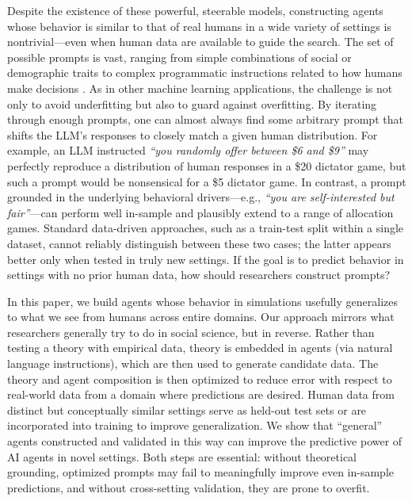 \documentclass[11pt]{article}
\theoremstyle{definition}
\newcommand{\aisub}{AI agent}
\newcommand{\persona}{prompt}
\begin{document}
Despite the existence of these powerful, steerable models, constructing agents whose behavior is similar to that of real humans in a wide variety of settings is nontrivial---even when human data are available to guide the search.
The set of possible \persona{s} is vast, ranging from simple combinations of social or demographic traits to complex programmatic instructions related to how humans make decisions \citep{zhu2025ExplPredicting,Jackson2025Mixture}.
As in other machine learning applications, the challenge is not only to avoid underfitting but also to guard against overfitting.
By iterating through enough \persona{s}, one can almost always find some arbitrary \persona{} that shifts the LLM's responses to closely match a given human distribution.
For example, an LLM instructed \emph{``you randomly offer between \$6 and \$9''} may perfectly reproduce a distribution of human responses in a \$20 dictator game, but such a \persona{} would be nonsensical for a \$5 dictator game.
In contrast, a \persona{} grounded in the underlying behavioral drivers---e.g., \emph{``you are self-interested but fair''}---can perform well in-sample and plausibly extend to a range of allocation games.
Standard data-driven approaches, such as a train-test split within a single dataset, cannot reliably distinguish between these two cases; the latter appears better only when tested in truly new settings.
If the goal is to predict behavior in settings with no prior human data, how should researchers construct \persona{s}?

In this paper, we build agents whose behavior in simulations usefully generalizes to what we see from humans across entire domains.
Our approach mirrors what researchers generally try to do in social science, but in reverse. 
Rather than testing a theory with empirical data, theory is embedded in agents (via natural language instructions), which are then used to generate candidate data.
The theory and agent composition is then optimized to reduce error with respect to real-world data from a domain where predictions are desired.
Human data from distinct but conceptually similar settings serve as held-out test sets or are incorporated into training to improve generalization.
We show that ``general'' agents constructed and validated in this way can improve the predictive power of \aisub{s} in novel settings.
Both steps are essential: without theoretical grounding, optimized \persona{s} may fail to meaningfully improve even in-sample predictions, and without cross-setting validation, they are prone to overfit.
\end{document}
